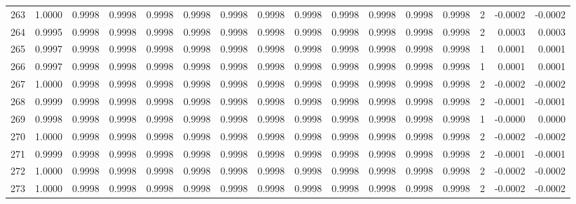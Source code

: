 \begin{tabular}{lrrrrrrrrrrrrrrr}
263 &      1.0000 &  0.9998 &  0.9998 &  0.9998 &  0.9998 &  0.9998 &  0.9998 &  0.9998 &  0.9998 &  0.9998 &   0.9998 &     0.9998 &      2 &                   -0.0002 &                    -0.0002 \\
264 &      0.9995 &  0.9998 &  0.9998 &  0.9998 &  0.9998 &  0.9998 &  0.9998 &  0.9998 &  0.9998 &  0.9998 &   0.9998 &     0.9998 &      2 &                    0.0003 &                     0.0003 \\
265 &      0.9997 &  0.9998 &  0.9998 &  0.9998 &  0.9998 &  0.9998 &  0.9998 &  0.9998 &  0.9998 &  0.9998 &   0.9998 &     0.9998 &      1 &                    0.0001 &                     0.0001 \\
266 &      0.9997 &  0.9998 &  0.9998 &  0.9998 &  0.9998 &  0.9998 &  0.9998 &  0.9998 &  0.9998 &  0.9998 &   0.9998 &     0.9998 &      1 &                    0.0001 &                     0.0001 \\
267 &      1.0000 &  0.9998 &  0.9998 &  0.9998 &  0.9998 &  0.9998 &  0.9998 &  0.9998 &  0.9998 &  0.9998 &   0.9998 &     0.9998 &      2 &                   -0.0002 &                    -0.0002 \\
268 &      0.9999 &  0.9998 &  0.9998 &  0.9998 &  0.9998 &  0.9998 &  0.9998 &  0.9998 &  0.9998 &  0.9998 &   0.9998 &     0.9998 &      2 &                   -0.0001 &                    -0.0001 \\
269 &      0.9998 &  0.9998 &  0.9998 &  0.9998 &  0.9998 &  0.9998 &  0.9998 &  0.9998 &  0.9998 &  0.9998 &   0.9998 &     0.9998 &      1 &                   -0.0000 &                     0.0000 \\
270 &      1.0000 &  0.9998 &  0.9998 &  0.9998 &  0.9998 &  0.9998 &  0.9998 &  0.9998 &  0.9998 &  0.9998 &   0.9998 &     0.9998 &      2 &                   -0.0002 &                    -0.0002 \\
271 &      0.9999 &  0.9998 &  0.9998 &  0.9998 &  0.9998 &  0.9998 &  0.9998 &  0.9998 &  0.9998 &  0.9998 &   0.9998 &     0.9998 &      2 &                   -0.0001 &                    -0.0001 \\
272 &      1.0000 &  0.9998 &  0.9998 &  0.9998 &  0.9998 &  0.9998 &  0.9998 &  0.9998 &  0.9998 &  0.9998 &   0.9998 &     0.9998 &      2 &                   -0.0002 &                    -0.0002 \\
273 &      1.0000 &  0.9998 &  0.9998 &  0.9998 &  0.9998 &  0.9998 &  0.9998 &  0.9998 &  0.9998 &  0.9998 &   0.9998 &     0.9998 &      2 &                   -0.0002 &                    -0.0002 \\

\end{tabular}

